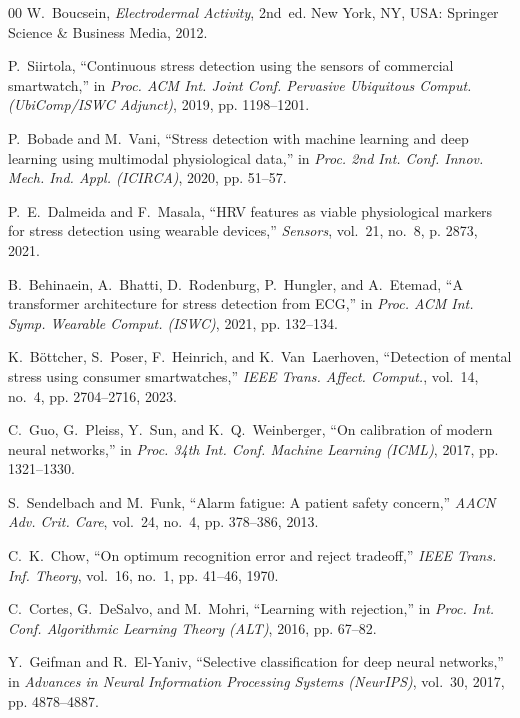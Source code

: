 \documentclass[conference]{IEEEtran}
\begin{document}
\begin{thebibliography}{00}
W.~Boucsein, \textit{Electrodermal Activity}, 2nd~ed. New York, NY, USA: Springer Science \& Business Media, 2012.

P.~Siirtola, ``Continuous stress detection using the sensors of commercial smartwatch,'' in \textit{Proc. ACM Int. Joint Conf. Pervasive Ubiquitous Comput. (UbiComp/ISWC Adjunct)}, 2019, pp. 1198--1201.

P.~Bobade and M.~Vani, ``Stress detection with machine learning and deep learning using multimodal physiological data,'' in \textit{Proc. 2nd Int. Conf. Innov. Mech. Ind. Appl. (ICIRCA)}, 2020, pp. 51--57.

P.~E.~Dalmeida and F.~Masala, ``HRV features as viable physiological markers for stress detection using wearable devices,'' \textit{Sensors}, vol.~21, no.~8, p. 2873, 2021.

B.~Behinaein, A.~Bhatti, D.~Rodenburg, P.~Hungler, and A.~Etemad, ``A transformer architecture for stress detection from ECG,'' in \textit{Proc. ACM Int. Symp. Wearable Comput. (ISWC)}, 2021, pp. 132--134.

K.~B\"ottcher, S.~Poser, F.~Heinrich, and K.~Van~Laerhoven, ``Detection of mental stress using consumer smartwatches,'' \textit{IEEE Trans. Affect. Comput.}, vol.~14, no.~4, pp. 2704--2716, 2023.

C.~Guo, G.~Pleiss, Y.~Sun, and K.~Q.~Weinberger, ``On calibration of modern neural networks,'' in \textit{Proc. 34th Int. Conf. Machine Learning (ICML)}, 2017, pp. 1321--1330.

S.~Sendelbach and M.~Funk, ``Alarm fatigue: A patient safety concern,'' \textit{AACN Adv. Crit. Care}, vol.~24, no.~4, pp. 378--386, 2013.

C.~K.~Chow, ``On optimum recognition error and reject tradeoff,'' \textit{IEEE Trans. Inf. Theory}, vol.~16, no.~1, pp. 41--46, 1970.

C.~Cortes, G.~DeSalvo, and M.~Mohri, ``Learning with rejection,'' in \textit{Proc. Int. Conf. Algorithmic Learning Theory (ALT)}, 2016, pp. 67--82.

Y.~Geifman and R.~El-Yaniv, ``Selective classification for deep neural networks,'' in \textit{Advances in Neural Information Processing Systems (NeurIPS)}, vol.~30, 2017, pp. 4878--4887.


\end{thebibliography}
\end{document}
